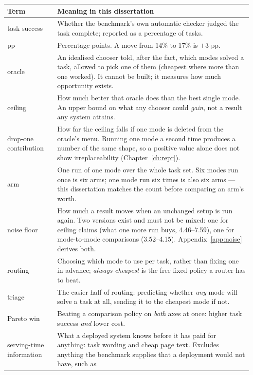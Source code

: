 {\begin{center}\small
\begin{tabularx}{\textwidth}{@{}lX@{}}
\toprule
Term & Meaning in this dissertation \\
\midrule
task success & Whether the benchmark's own automatic checker judged the task
              complete; reported as a percentage of tasks. \\
pp          & Percentage points. A move from 14\% to 17\% is $+3$ pp. \\
oracle & An idealised chooser told, after the fact, which modes solved a task,
allowed to pick one of them (cheapest where more than one worked). It cannot
be built; it measures how much opportunity exists. \\
ceiling & How much better that oracle does than the best single mode. An upper
bound on what any chooser could \emph{gain}, not a result any system attains. \\
drop-one contribution & How far the ceiling falls if one mode is deleted from
the oracle's menu. Running one mode a second time produces a number of the same
shape, so a positive value alone does not show irreplaceability
(Chapter~\ref{ch:repr}). \\
arm & One run of one mode over the whole task set. Six modes run once is six
arms; one mode run six times is also six arms — this dissertation matches the
count before comparing an arm's worth. \\
noise floor & How much a result moves when an unchanged setup is run again.
Two versions exist and must not be mixed: one for ceiling claims (what one more
run buys, 4.46--7.59\pp{}), one for mode-to-mode comparisons
(3.52--4.15\pp{}). Appendix~\ref{app:noise} derives both. \\
routing     & Choosing which mode to use per task, rather than fixing one in
              advance; \emph{always-cheapest} is the free fixed policy a router
              has to beat. \\
triage & The easier half of routing: predicting whether \emph{any} mode will
solve a task at all, sending it to the cheapest mode if not. \\
Pareto win  & Beating a comparison policy on \emph{both} axes at once: higher
              task success \emph{and} lower cost. \\
serving-time information & What a deployed system knows before it has paid for
              anything: task wording and cheap page text. Excludes anything
              the benchmark supplies that a deployment would not have, such as

\end{tabularx}
\end{center}}
